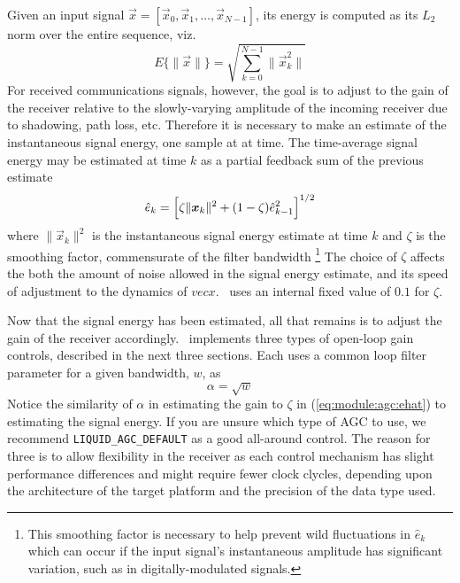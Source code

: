 Given an input signal
$\vec{x} = [\vec{x}_0, \vec{x}_1, \ldots, \vec{x}_{N-1}]$,
its energy is computed as its $L_2$ norm over the entire sequence, viz.
\[
    E\{ \|\vec{x}\| \} = 
        \sqrt{
            \sum\limits_{k=0}^{N-1} {\|\vec{x}_k^2\|}
        }
\]
For received communications signals, however, the goal is to adjust to the
gain of the receiver relative to the slowly-varying amplitude of the incoming
receiver due to shadowing, path loss, etc.
Therefore it is necessary to make an estimate of the instantaneous signal
energy, one sample at at time.
The time-average signal energy may be estimated at time $k$ as a partial
feedback sum of the previous estimate
\begin{equation}
\label{eq:module:agc:ehat}
    \hat{e}_k =
        \Bigl[
            \zeta\|\vec{x}_k\|^2 + (1-\zeta)\hat{e}_{k-1}^2
        \Bigr]^{1/2}
\end{equation}
where $\| \vec{x}_k \|^2$ is the instantaneous signal energy estimate at time
$k$ and $\zeta$ is the smoothing factor, commensurate of the filter bandwidth%
\footnote{This smoothing factor is necessary to help prevent wild fluctuations
in $\hat{e}_k$ which can occur if the input signal's instantaneous amplitude
has significant variation, such as in digitally-modulated signals.}
The choice of $\zeta$ affects the both the amount of noise allowed in the
signal energy estimate, and its speed of adjustment to the dynamics of
$vec{x}$.
\liquid\ uses an internal fixed value of $0.1$ for $\zeta$.

Now that the signal energy has been estimated, all that remains is to adjust
the gain of the receiver accordingly.
\liquid\ implements three types of open-loop gain controls, described in the
next three sections.
Each uses a common loop filter parameter for a given bandwidth, $w$, as
\[
    \alpha = \sqrt{w}
\]
Notice the similarity of $\alpha$ in estimating the gain to $\zeta$ in
(\ref{eq:module:agc:ehat}) to estimating the signal energy.
If you are unsure which type of AGC to use, we recommend
{\tt LIQUID\_AGC\_DEFAULT} as a good all-around control.
The reason for three is to allow flexibility in the receiver as
each control mechanism has slight performance differences and might require
fewer clock clycles, depending upon the architecture of the target platform
and the precision of the data type used.

